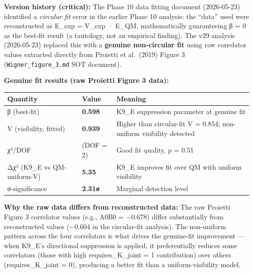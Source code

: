 \documentclass[
  11pt,
]{article}
\newcounter{none} %
\begin{document}
\textbf{Version history (critical):} The Phase 10 data fitting document
(2026-05-23) identified a \emph{circular fit} error in the earlier Phase
10 analysis: the ``data'' used were reconstructed as E\_exp = V\_exp ·
E\_QM, mathematically guaranteeing β = 0 as the best-fit result (a
tautology, not an empirical finding). The v29 analysis (2026-05-23)
replaced this with a \textbf{genuine non-circular fit} using raw
correlator values extracted directly from Proietti et al.~(2019) Figure
3 (\texttt{Wigner\_figure\_3.md} SOT document).

\textbf{Genuine fit results (raw Proietti Figure 3 data):}

{\def\LTcaptype{none} %
\begin{longtable}[]{@{}
  >{\raggedright\arraybackslash}p{}
  >{\raggedright\arraybackslash}p{}
  >{\raggedright\arraybackslash}p{}@{}}
\toprule\noalign{}
\begin{minipage}[b]{\linewidth}\raggedright
Quantity
\end{minipage} & \begin{minipage}[b]{\linewidth}\raggedright
Value
\end{minipage} & \begin{minipage}[b]{\linewidth}\raggedright
Meaning
\end{minipage} \\
\midrule\noalign{}
\endhead
\bottomrule\noalign{}
\endlastfoot
β (best-fit) & \textbf{0.598} & K9\_E suppression parameter at genuine
fit \\
V (visibility, fitted) & \textbf{0.939} & Higher than circular-fit V =
0.854; non-uniform visibility detected \\
χ²/DOF & 0.670 (DOF = 2) & Good fit quality, p = 0.51 \\
Δχ² (K9\_E vs QM-uniform-V) & \textbf{5.35} & K9\_E improves fit over QM
with uniform visibility \\
σ-significance & \textbf{2.31σ} & Marginal detection level \\
\end{longtable}
}

\textbf{Why the raw data differs from reconstructed data:} The raw
Proietti Figure 3 correlator values (e.g., A0B0 = −0.678) differ
substantially from reconstructed values (−0.604 in the circular-fit
analysis). The non-uniform pattern across the four correlators is what
drives the genuine-fit improvement --- when K9\_E's directional
suppression is applied, it preferentially reduces some correlators
(those with high requires\_K\_joint = 1 contribution) over others
(requires\_K\_joint = 0), producing a better fit than a
uniform-visibility model.
\end{document}
